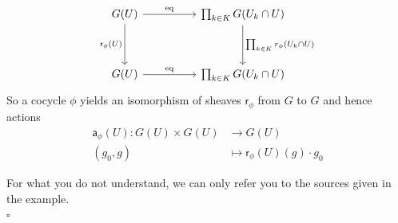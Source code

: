 \begin{exa}
\[
\begin{tikzcd}[sep=huge]
  G(U)
  \arrow{r}{\mathrm{eq}}
  \arrow[swap]{d}{\mathsf{r}_{\phi}(U)}
  &
  \prod_{k \in K}
  G(U_{k} \cap U)
  \arrow{d}{\prod_{k \in K}r_{\phi}(U_{k} \cap U)}
  \\
  G(U)
  \arrow{r}{\mathrm{eq}}
  &
  \prod_{k \in K}
  G(U_{k} \cap U)
\end{tikzcd}
\]
So a cocycle $\phi$ yields an isomorphism of sheaves $\mathsf{r}_{\phi}$ from $G$ to $G$ and hence actions
\begin{align*}
  \mathsf{a}_{\phi}(U)
  \colon
  G(U)
  \times
  G(U)
  &\rightarrow
  G(U)
  \\
  (g_{0},g)
  &\mapsto
  \mathsf{r}_{\phi}(U)(g)
  \cdot
  g_{0}
\end{align*}
\fi
\end{exa}
\begin{prf}
For what you do not understand, we can only refer you to the sources given in the example.
\\
\phantom{proven}
\hfill
$\square$
\end{prf}
